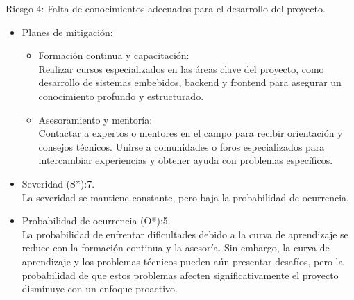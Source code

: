 Riesgo 4: Falta de conocimientos adecuados para el desarrollo del proyecto.
\begin{itemize}
	\item Planes de mitigación:\\
	      \begin{itemize}
		      \item Formación continua y capacitación:\\ Realizar cursos especializados en las
		            áreas clave del proyecto, como desarrollo de sistemas embebidos, backend y
		            frontend para asegurar un conocimiento profundo y estructurado.
		      \item Asesoramiento y mentoría:\\ Contactar a expertos o mentores en el campo para
		            recibir orientación y consejos técnicos. Unirse a comunidades o foros
		            especializados para intercambiar experiencias y obtener ayuda con problemas
		            específicos.
	      \end{itemize}
	\item Severidad (S*):7.\\ La severidad se mantiene constante, pero baja la probabilidad de ocurrencia.
	\item Probabilidad de ocurrencia (O*):5.\\ La probabilidad de enfrentar dificultades
	      debido a la curva de aprendizaje se reduce con la formación continua y la
	      asesoría. Sin embargo, la curva de aprendizaje y los problemas técnicos pueden
	      aún presentar desafíos, pero la probabilidad de que estos problemas afecten
	      significativamente el proyecto disminuye con un enfoque proactivo.
\end{itemize}